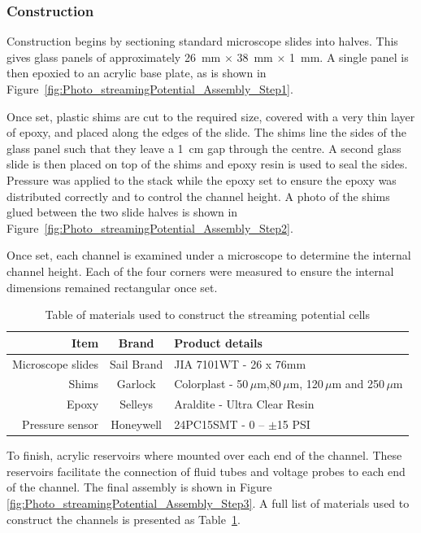     \subsubsection*{Construction}

      Construction begins by sectioning standard microscope slides into halves.
      This gives glass panels of approximately \SI{26}{\milli\meter} $\times$ \SI{38}{\milli\meter} $\times$ \SI{1}{\milli\meter}.
      A single panel is then epoxied to an acrylic base plate, as is shown in Figure~\ref{fig:Photo_streamingPotential_Assembly_Step1}.

      Once set, plastic shims are cut to the required size, covered with a very thin layer of epoxy, and placed along the edges of the slide.
      The shims line the sides of the glass panel such that they leave a \SI{1}{\centi\meter} gap through the centre.
      A second glass slide is then placed on top of the shims and epoxy resin is used to seal the sides.
      Pressure was applied to the stack while the epoxy set to ensure the epoxy was distributed correctly and to control the channel height.
      A photo of the shims glued between the two slide halves is shown in Figure~\ref{fig:Photo_streamingPotential_Assembly_Step2}.

      Once set, each channel is examined under a microscope to determine the internal channel height.
      Each of the four corners were measured to ensure the internal dimensions remained rectangular once set.

      \begin{table}
        \begin{tabular}{r|c|l}
          Item & Brand & Product details\tabularnewline\hline
          Microscope slides & Sail Brand & JIA 7101WT - 26 x 76mm\tabularnewline
          Shims & Garlock & Colorplast - 50$\,\mu$m,80$\,\mu$m, 120$\,\mu$m and 250$\,\mu$m\tabularnewline
          Epoxy & Selleys & Araldite - Ultra Clear Resin\tabularnewline
          Pressure sensor & Honeywell & 24PC15SMT - 0 -- $\pm$15 PSI\tabularnewline
        \end{tabular}
        \caption{\label{Table_StreamingCell_MaterialsUsed}Table of materials used to construct the streaming potential cells}
      \end{table}

      To finish, acrylic reservoirs where mounted over each end of the channel.
      These reservoirs facilitate the connection of fluid tubes and voltage probes to each end of the channel.
      The final assembly is shown in Figure \ref{fig:Photo_streamingPotential_Assembly_Step3}.
      A full list of materials used to construct the channels is presented as Table~\ref{Table_StreamingCell_MaterialsUsed}.

